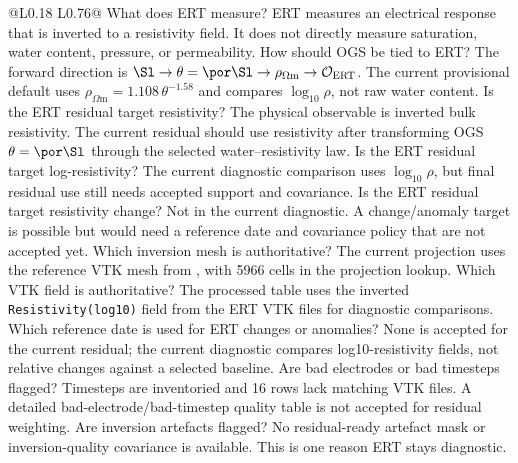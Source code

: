 \begin{longtable}{@{}L{0.18\textwidth} L{0.76\textwidth}@{}}
\toprule
{}
{ What does ERT measure?}
{ERT measures an electrical response that is inverted to a resistivity field.  It
does not directly measure saturation, water content, pressure, or permeability.}
{ How should OGS be tied to ERT?}
{The forward direction is
\(\Sl\rightarrow\theta=\por\Sl\rightarrow\rho_{\Omega\mathrm{m}}\rightarrow
\mathcal O_{\mathrm{ERT}}\).  The current provisional default uses
\(\rho_{\Omega\mathrm{m}}=1.108\,\theta^{-1.58}\) and compares
\(\log_{10}\rho\), not raw water content.}
{ Is the ERT residual target resistivity?}
{The physical observable is inverted bulk resistivity.  The current residual should
use resistivity after transforming OGS \(\theta=\por\Sl\) through the selected
water--resistivity law.}
{ Is the ERT residual target log-resistivity?}
{The current diagnostic comparison uses \(\log_{10}\rho\), but final residual use
still needs accepted support and covariance.}
{ Is the ERT residual target resistivity change?}
{Not in the current diagnostic.  A change/anomaly target is possible but would need a
reference date and covariance policy that are not accepted yet.}
{ Which inversion mesh is authoritative?}
{The current projection uses the reference VTK mesh from
, with 5966 cells in the
projection lookup.}
{ Which VTK field is authoritative?}
{The processed table uses the inverted \texttt{Resistivity(log10)} field from the
ERT VTK files for diagnostic comparisons.}
{ Which reference date is used for ERT changes or anomalies?}
{None is accepted for the current residual; the current diagnostic compares
log10-resistivity fields, not relative changes against a selected baseline.}
{ Are bad electrodes or bad timesteps flagged?}
{Timesteps are inventoried and 16 rows lack matching VTK files.  A detailed
bad-electrode/bad-timestep quality table is not accepted for residual
weighting.}
{ Are inversion artefacts flagged?}
{No residual-ready artefact mask or inversion-quality covariance is available.  This
is one reason ERT stays diagnostic.}

\end{longtable}
